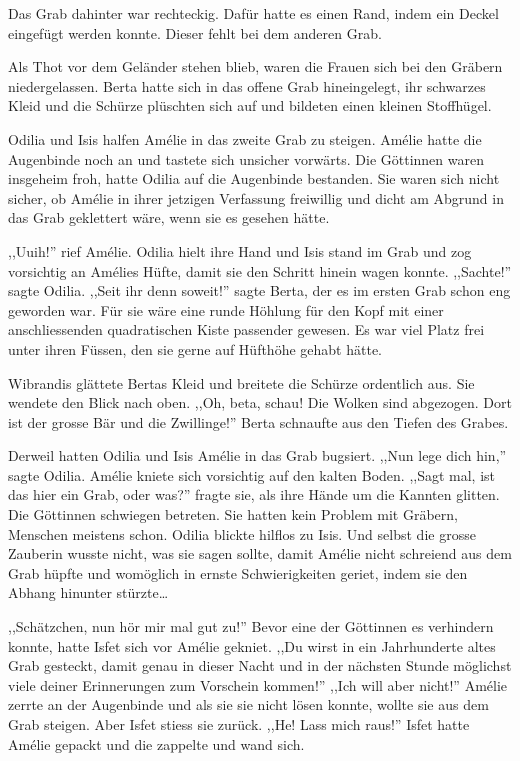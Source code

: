 Das Grab dahinter war rechteckig. Dafür hatte es einen Rand, indem ein Deckel eingefügt werden konnte. Dieser fehlt bei dem anderen Grab.

Als Thot vor dem Geländer stehen blieb, waren die Frauen sich bei den Gräbern niedergelassen. Berta hatte sich in das offene Grab hineingelegt, ihr schwarzes Kleid und die Schürze plüschten sich auf und bildeten einen kleinen Stoffhügel.

Odilia und Isis halfen Amélie in das zweite Grab zu steigen. Amélie hatte die Augenbinde noch an und tastete sich unsicher vorwärts. Die Göttinnen waren insgeheim froh, hatte Odilia auf die Augenbinde bestanden. Sie waren sich nicht sicher, ob Amélie in ihrer jetzigen Verfassung freiwillig und dicht am Abgrund in das Grab geklettert wäre, wenn sie es gesehen hätte.

,,Uuih!'' rief Amélie. Odilia hielt ihre Hand und Isis stand im Grab und zog vorsichtig an Amélies Hüfte, damit sie den Schritt hinein wagen konnte. ,,Sachte!'' sagte Odilia. ,,Seit ihr denn soweit!'' sagte Berta, der es im ersten Grab schon eng geworden war. Für sie wäre eine runde Höhlung für den Kopf mit einer anschliessenden quadratischen Kiste passender gewesen. Es war viel Platz frei unter ihren Füssen, den sie gerne auf Hüfthöhe gehabt hätte.

Wibrandis glättete Bertas Kleid und breitete die Schürze ordentlich aus. Sie wendete den Blick nach oben. ,,Oh, beta, schau! Die Wolken sind abgezogen. Dort ist der grosse Bär und die Zwillinge!'' Berta schnaufte aus den Tiefen des Grabes.

Derweil hatten Odilia und Isis Amélie in das Grab bugsiert. ,,Nun lege dich hin,'' sagte Odilia. Amélie kniete sich vorsichtig auf den kalten Boden. ,,Sagt mal, ist das hier ein Grab, oder was?'' fragte sie, als ihre Hände um die Kannten glitten. Die Göttinnen schwiegen betreten. Sie hatten kein Problem mit Gräbern, Menschen meistens schon. Odilia blickte hilflos zu Isis. Und selbst die grosse Zauberin wusste nicht, was sie sagen sollte, damit Amélie nicht schreiend aus dem Grab hüpfte und womöglich in ernste Schwierigkeiten geriet, indem sie den Abhang hinunter stürzte\dots

,,Schätzchen, nun hör mir mal gut zu!'' Bevor eine der Göttinnen es verhindern konnte, hatte Isfet sich vor Amélie gekniet. ,,Du wirst in ein Jahrhunderte altes Grab gesteckt, damit genau in dieser Nacht und in der nächsten Stunde möglichst viele deiner Erinnerungen zum Vorschein kommen!'' ,,Ich will aber nicht!'' Amélie zerrte an der Augenbinde und als sie sie nicht lösen konnte, wollte sie aus dem Grab steigen. Aber Isfet stiess sie zurück. ,,He! Lass mich raus!'' Isfet hatte Amélie gepackt und die zappelte und wand sich.

